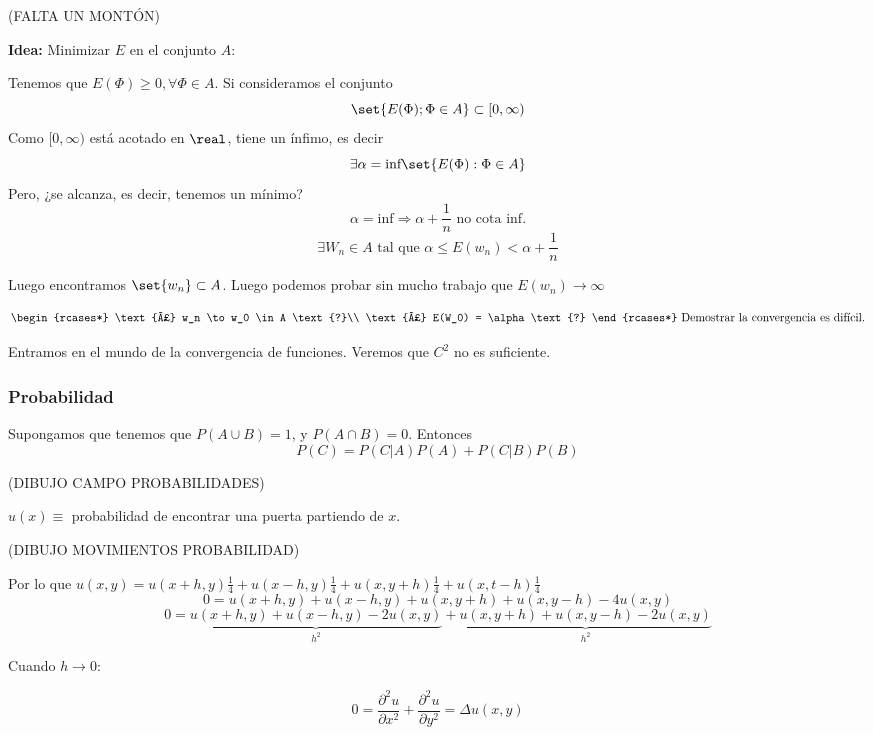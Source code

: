 		(FALTA UN MONTÓN)

		\textbf{Idea:} Minimizar $E$ en el conjunto $A$:

		Tenemos que $E(\Phi) \geq 0, \forall \Phi \in A$. Si consideramos el conjunto
			\[ \set{ E(\Phi); \Phi \in A} \subset [0, \infty) \]
		Como $[0, \infty)$ está acotado en $\real$, tiene un ínfimo, es decir
		\[ \exists \alpha = \text{inf}\set{E(\Phi) : \Phi \in A} \]
		Pero, ¿se alcanza, es decir, tenemos un mínimo?
		\[ \alpha = \text{inf} \Rightarrow \alpha + \frac{1}{n} \text{ no cota inf.} \]
		\[ \exists W_n \in A \text{ tal que } \alpha \leq E(w_n) < \alpha + \frac{1}{n} \]

		Luego encontramos $\set{w_n} \subset A$. Luego podemos probar sin mucho trabajo que $E(w_n) \rightarrow \infty$

		\[ \begin{rcases*}
			\text{¿} w_n \to w_0 \in A \text{?}\\
			\text{¿} E(W_0) = \alpha \text{?}
		\end{rcases*} \text{ Demostrar la convergencia es difícil.}
		\]

		Entramos en el mundo de la convergencia de funciones. Veremos que $C^2$ no es suficiente.



		\subsubsection{Probabilidad}
		\begin{theorem}
		Supongamos que tenemos que $P(A \cup B) = 1$, y $P(A \cap B) = 0$. Entonces
		\[P(C) = P(C|A) P(A) + P(C|B) P(B)\]
		\end{theorem}

		(DIBUJO CAMPO PROBABILIDADES)

		$u(x) \equiv$ probabilidad de encontrar una puerta partiendo de $x$.

		(DIBUJO MOVIMIENTOS PROBABILIDAD)

		Por lo que $u(x,y) = u(x+h,y) \frac{1}{4} + u(x-h,y) \frac{1}{4} + u(x,y+h)\frac{1}{4} + u(x,t-h)\frac{1}{4} $
		\[ 0 = u(x+h,y) + u(x-h,y)+ u(x,y+h) + u(x,y-h) - 4u(x,y) \]
		\[ 0 = \underbrace{u(x+h,y) + u(x-h,y) -2u(x,y)}_{h^2} + \underbrace{u(x,y+h) + u(x,y-h) - 2u(x,y)}_{h^2}\]

		Cuando $h \to 0$:

		\[ 0 = \frac{\partial^2 u}{\partial x^2} + \frac{\partial^2 u}{\partial y^2} = \Delta u(x,y)\]

